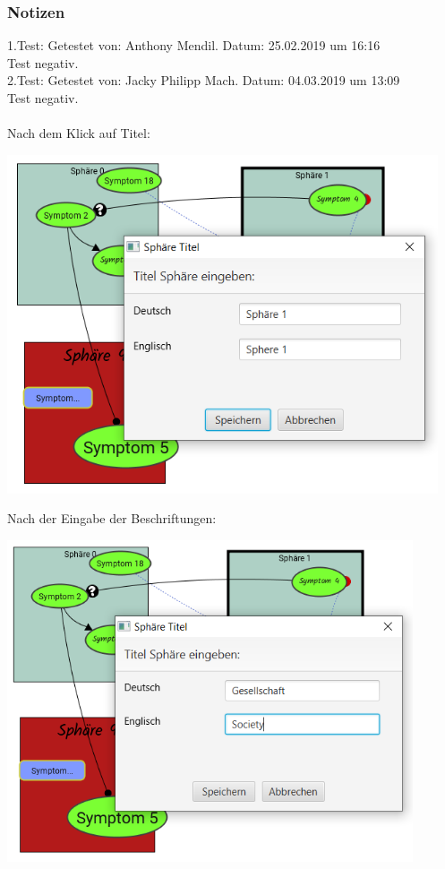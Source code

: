 \documentclass[enabledeprecatedfontcommands]{scrartcl}
\begin{document}
\subsubsection{Notizen}
1.Test: Getestet von: Anthony Mendil. Datum: 25.02.2019 um 16:16 \\
Test negativ. \\
2.Test: Getestet von: Jacky Philipp Mach. Datum: 04.03.2019 um 13:09 \\
Test negativ.\\\\
Nach dem Klick auf Titel: 
\begin{center}
\includegraphics[height=10cm]{3_49oeffnen.PNG}
\end{center}
\newpage
Nach der Eingabe der Beschriftungen:
\begin{center}
\includegraphics[height=9.5cm]{3_49eingabe.PNG}
\end{center}
\end{document}
